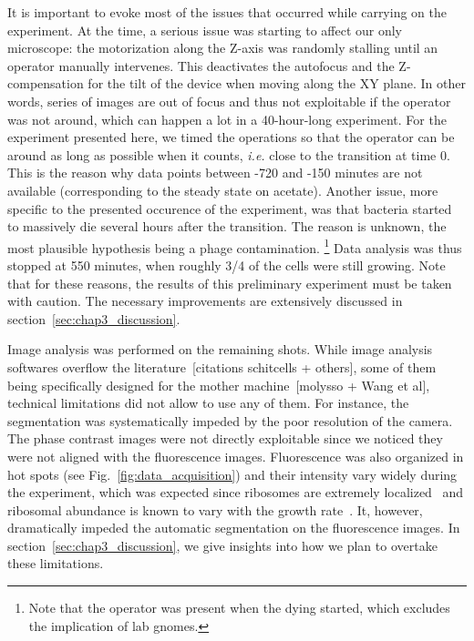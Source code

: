 It is important to evoke most of the issues that occurred while carrying on the experiment.
At the time, a serious issue was starting to affect our only microscope: the motorization along the Z-axis was randomly stalling until an operator manually intervenes.
This deactivates the autofocus and the Z-compensation for the tilt of the device when moving along the XY plane.
In other words, series of images are out of focus and thus not exploitable if the operator was not around, which can happen a lot in a 40-hour-long experiment.
For the experiment presented here, we timed the operations so that the operator can be around as long as possible when it counts, \textit{i.e.} close to the transition at time 0.
This is the reason why data points between -720 and -150 minutes are not available (corresponding to the steady state on acetate).
Another issue, more specific to the presented occurence of the experiment, was that bacteria started to massively die several hours after the transition.
The reason is unknown, the most plausible hypothesis being a phage contamination.
\footnote{Note that the operator was present when the dying started, which excludes the implication of lab gnomes.}
Data analysis was thus stopped at 550 minutes, when roughly 3/4 of the cells were still growing.
Note that for these reasons, the results of this preliminary experiment must be taken with caution.
The necessary improvements are extensively discussed in section~\ref{sec:chap3_discussion}.

Image analysis was performed on the remaining shots.
While image analysis softwares overflow the literature~[citations schitcells + others], some of them being specifically designed for the mother machine~[molysso + Wang et al], technical limitations did not allow to use any of them.
For instance, the segmentation was systematically impeded by the poor resolution of the camera.
The phase contrast images were not directly exploitable since we noticed they were not aligned with the fluorescence images.
Fluorescence was also organized in hot spots (see Fig.~\ref{fig:data_acquisition}) and their intensity vary widely during the experiment, which was expected since ribosomes are extremely localized~\cite{bakshi_superresolution_2012} and ribosomal abundance is known to vary with the growth rate~\cite{scott_interdependence_2010}.
It, however, dramatically impeded the automatic segmentation on the fluorescence images.
In section~\ref{sec:chap3_discussion}, we give insights into how we plan to overtake these limitations.

